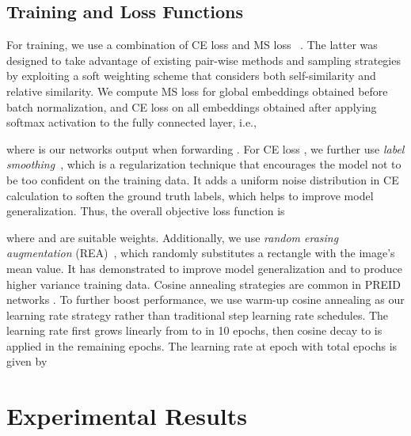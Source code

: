 \documentclass{article}
\begin{document}
\subsection{Training and Loss Functions}
\label{sec:training}
For training, we use a combination of \ac{CE} loss and \ac{MS} loss ~\cite{wang2019multi}. The latter was designed to take advantage of existing pair-wise methods and sampling strategies by exploiting a soft weighting scheme that  considers both self-similarity and relative similarity. We compute MS loss  for global embeddings  obtained before batch normalization, and CE loss  on all embeddings  obtained after applying softmax activation to the fully connected layer, i.e.,

where  is our networks output when forwarding . For \ac{CE} loss , we further use \emph{label smoothing}~\cite{szegedy2016rethinking, luo2019bag}, which is a regularization technique that encourages the model not to be too confident on the training data. It adds a uniform noise distribution in \ac{CE} calculation to soften the ground truth labels, which helps to improve model generalization.
Thus, the overall objective loss function is

where  and  are suitable weights.
Additionally, we use \emph{random erasing augmentation} (REA)~\cite{zhong2017random}, which randomly substitutes a rectangle with the image's mean value. It has demonstrated to improve  model generalization and to produce higher variance training data.
Cosine annealing strategies are common in \ac{PREID} networks \cite{zhou2019omni, zhu2020voc}. To further boost performance, we use warm-up cosine annealing \cite{goyal2017accurate, he2019bag} as our learning rate strategy rather than traditional step learning rate schedules. The learning rate first grows linearly from  to  in 10 epochs, then cosine decay to  is applied in the remaining epochs. The learning rate  at epoch  with  total epochs is given by


\section{Experimental Results}
\label{sec:exp}
\end{document}
